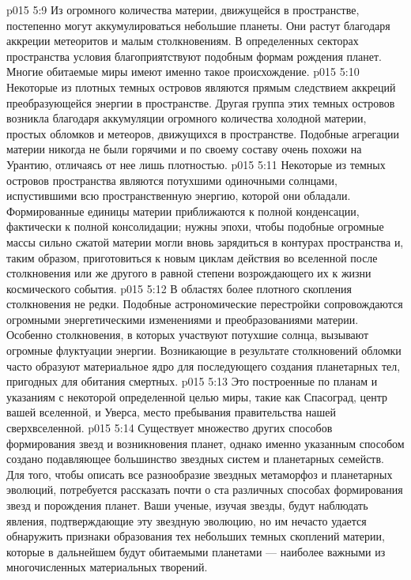 \vs p015 5:9 \pc {}\bibnobreakspace {} Из огромного количества материи, движущейся в пространстве, постепенно могут аккумулироваться небольшие планеты. Они растут благодаря аккреции метеоритов и малым столкновениям. В определенных секторах пространства условия благоприятствуют подобным формам рождения планет. Многие обитаемые миры имеют именно такое происхождение.
\vs p015 5:10 Некоторые из плотных темных островов являются прямым следствием аккреций преобразующейся энергии в пространстве. Другая группа этих темных островов возникла благодаря аккумуляции огромного количества холодной материи, простых обломков и метеоров, движущихся в пространстве. Подобные агрегации материи никогда не были горячими и по своему составу очень похожи на Урантию, отличаясь от нее лишь плотностью.
\vs p015 5:11 \pc {}\bibnobreakspace {} Некоторые из темных островов пространства являются потухшими одиночными солнцами, испустившими всю пространственную энергию, которой они обладали. Формированные единицы материи приближаются к полной конденсации, фактически к полной консолидации; нужны эпохи, чтобы подобные огромные массы сильно сжатой материи могли вновь зарядиться в контурах пространства и, таким образом, приготовиться к новым циклам действия во вселенной после столкновения или же другого в равной степени возрождающего их к жизни космического события.
\vs p015 5:12 \pc {}\bibnobreakspace {} В областях более плотного скопления столкновения не редки. Подобные астрономические перестройки сопровождаются огромными энергетическими изменениями и преобразованиями материи. Особенно столкновения, в которых участвуют потухшие солнца, вызывают огромные флуктуации энергии. Возникающие в результате столкновений обломки часто образуют материальное ядро для последующего создания планетарных тел, пригодных для обитания смертных.
\vs p015 5:13 \pc {}\bibnobreakspace {} Это построенные по планам и указаниям с некоторой определенной целью миры, такие как Спасоград, центр вашей вселенной, и Уверса, место пребывания правительства нашей сверхвселенной.
\vs p015 5:14 \pc Существует множество других способов формирования звезд и возникновения планет, однако именно указанным способом создано подавляющее большинство звездных систем и планетарных семейств. Для того, чтобы описать все разнообразие звездных метаморфоз и планетарных эволюций, потребуется рассказать почти о ста различных способах формирования звезд и порождения планет. Ваши ученые, изучая звезды, будут наблюдать явления, подтверждающие эту звездную эволюцию, но им нечасто удается обнаружить признаки образования тех небольших темных скоплений материи, которые в дальнейшем будут обитаемыми планетами --- наиболее важными из многочисленных материальных творений.
